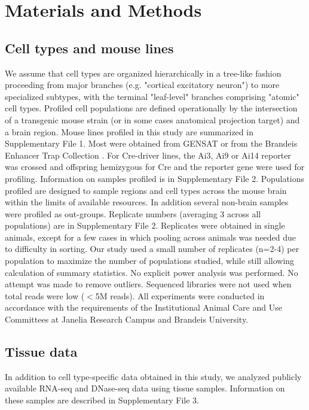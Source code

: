 \section{Materials and Methods}

\subsection{Cell types and mouse lines}
We assume that cell types are organized hierarchically in a tree-like fashion proceeding from major branches (e.g. "cortical excitatory neuron") to more specialized subtypes, with the terminal "leaf-level" branches comprising "atomic" cell types. Profiled cell populations are defined operationally by the intersection of a transgenic mouse strain (or in some cases anatomical projection target) and a brain region. Mouse lines profiled in this study are summarized in Supplementary File 1. Most were obtained from GENSAT \citep{Gong_2007} or from the Brandeis Enhancer Trap Collection \citep{Shima_2016}. For Cre-driver lines, the Ai3, Ai9 or Ai14 reporter \citep{Madisen_2009} was crossed and offspring hemizygous for Cre and the reporter gene were used for profiling. Information on samples profiled is in Supplementary File 2. Populations profiled are designed to sample regions and cell types across the mouse brain within the limits of available resources. In addition several non-brain samples were profiled as out-groups. Replicate numbers (averaging 3 across all populations) are in Supplementary File 2. Replicates were obtained in single animals, except for a few cases in which pooling across animals was needed due to difficulty in sorting. Our study used a small number of replicates (n=2-4) per population to maximize the number of populations studied, while still allowing calculation of summary statistics. No explicit power analysis was performed. No attempt was made to remove outliers. Sequenced libraries were not used when total reads were low ($<$5M reads). All experiments were conducted in accordance with the requirements of the Institutional Animal Care and Use Committees at Janelia Research Campus and Brandeis University.

\subsection{Tissue data}
In addition to cell type-specific data obtained in this study, we analyzed publicly available RNA-seq and DNase-seq data using tissue samples. Information on these samples are described in Supplementary File 3.

